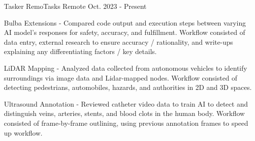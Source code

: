 

\begin{cventries}

  \cventry
    {Tasker} %
    {RemoTasks} %
    {Remote} %
    {Oct. 2023 - Present} %
    {
      \begin{cvitems} %
		  \item {Bulba Extensions - Compared code output and execution steps between varying AI model's responses for safety, accuracy, and fulfillment. Workflow consisted of data entry, external research to ensure accuracy / rationality, and write-ups explaining any differentiating factors / key details.}
		  \item {LiDAR Mapping - Analyzed data collected from autonomous vehicles to identify surroundings via image data and Lidar-mapped nodes. Workflow consisted of detecting pedestrians, automobiles, hazards, and authorities in 2D and 3D spaces.}
		  \item {Ultrasound Annotation - Reviewed catheter video data to train AI to detect and distinguish veins, arteries, stents, and blood clots in the human body. Workflow consisted of frame-by-frame outlining, using previous annotation frames to speed up workflow.}
      \end{cvitems}
    }


\end{cventries}
